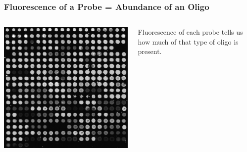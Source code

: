 \documentclass{beamer}
\begin{document}
\begin{frame}
  \frametitle{Fluorescence of a Probe = Abundance of an Oligo}
  \begin{columns}
    \begin{column}{0.48\textwidth}
      \begin{center}
        \includegraphics[scale=.4]{fluor_bw.png}
      \end{center}
    \end{column}
    \begin{column}{0.48\textwidth}
      Fluorescence of each probe tells us how much of that type of oligo is present. 
    \end{column}
  \end{columns}
\end{frame}
\end{document}
